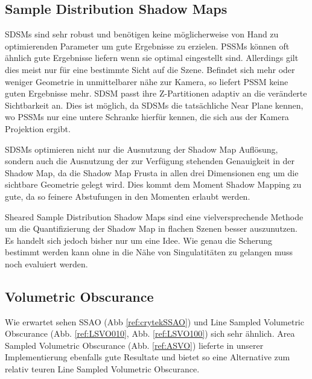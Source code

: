 \documentclass[runningheaders,a4paper]{llncs}
\begin{document}
\subsection{Sample Distribution Shadow Maps}
SDSMs sind sehr robust und benötigen keine möglicherweise von Hand zu optimierenden Parameter um gute Ergebnisse zu erzielen.
PSSMs können oft ähnlich gute Ergebnisse liefern wenn sie optimal eingestellt sind.
Allerdings gilt dies meist nur für eine bestimmte Sicht auf die Szene.
Befindet sich mehr oder weniger Geometrie in unmittelbarer nähe zur Kamera, so liefert PSSM keine guten Ergebnisse mehr.
SDSM passt ihre Z-Partitionen adaptiv an die veränderte Sichtbarkeit an.
Dies ist möglich, da SDSMs die tatsächliche Near Plane kennen, wo PSSMs nur eine untere Schranke hierfür kennen, die sich aus der Kamera Projektion ergibt.

SDSMs optimieren nicht nur die Ausnutzung der Shadow Map Auflösung, sondern auch die Ausnutzung der zur Verfügung stehenden Genauigkeit in der Shadow Map, da die Shadow Map Frusta in allen drei Dimensionen eng um die sichtbare Geometrie gelegt wird.
Dies kommt dem Moment Shadow Mapping zu gute, da so feinere Abstufungen in den Momenten erlaubt werden.

Sheared Sample Distribution Shadow Maps sind eine vielversprechende Methode um die Quantifizierung der Shadow Map in flachen Szenen besser auszunutzen.
Es handelt sich jedoch bisher nur um eine Idee.
Wie genau die Scherung bestimmt werden kann ohne in die Nähe von Singulatitäten zu gelangen muss noch evaluiert werden.


\subsection{Volumetric Obscurance} \label{ssec:voResult}
Wie erwartet sehen SSAO (Abb \ref{ref:crytekSSAO}) und Line Sampled Volumetric Obscurance 
(Abb. \ref{ref:LSVO010}, Abb. \ref{ref:LSVO100}) sich sehr ähnlich. 
Area Sampled Volumetric Obscurance (Abb. \ref{ref:ASVO})
lieferte in unserer Implementierung ebenfalls gute Resultate und bietet so eine Alternative 
zum relativ teuren Line Sampled Volumetric Obscurance. 
\end{document}
